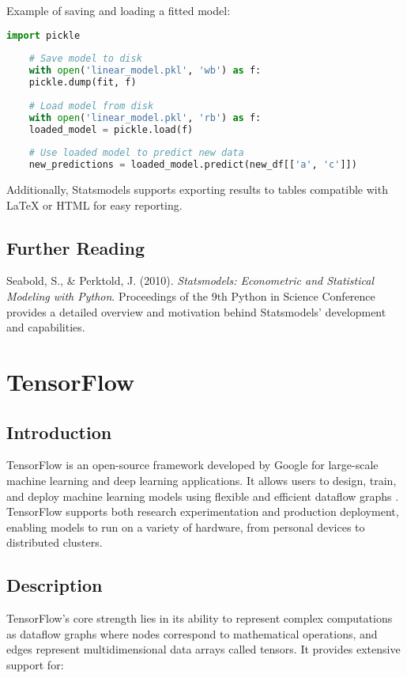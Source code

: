 Example of saving and loading a fitted model:

\begin{lstlisting}[language=python, basicstyle=\ttfamily\small]
	import pickle
	
	# Save model to disk
	with open('linear_model.pkl', 'wb') as f:
	pickle.dump(fit, f)
	
	# Load model from disk
	with open('linear_model.pkl', 'rb') as f:
	loaded_model = pickle.load(f)
	
	# Use loaded model to predict new data
	new_predictions = loaded_model.predict(new_df[['a', 'c']])
\end{lstlisting}


Additionally, Statsmodels supports exporting results to tables compatible with LaTeX or HTML for easy reporting.

\subsection{Further Reading}
Seabold, S., \& Perktold, J. (2010). \textit{Statsmodels: Econometric and Statistical Modeling with Python}. Proceedings of the 9th Python in Science Conference \cite{seabold2010statsmodels} provides a detailed overview and motivation behind Statsmodels' development and capabilities.



\section{TensorFlow}

\subsection{Introduction}
TensorFlow is an open-source framework developed by Google for large-scale machine learning and deep learning applications. It allows users to design, train, and deploy machine learning models using flexible and efficient dataflow graphs \cite{abadi2016tensorflow}. TensorFlow supports both research experimentation and production deployment, enabling models to run on a variety of hardware, from personal devices to distributed clusters.

\subsection{Description}
TensorFlow's core strength lies in its ability to represent complex computations as dataflow graphs where nodes correspond to mathematical operations, and edges represent multidimensional data arrays called tensors. It provides extensive support for:

